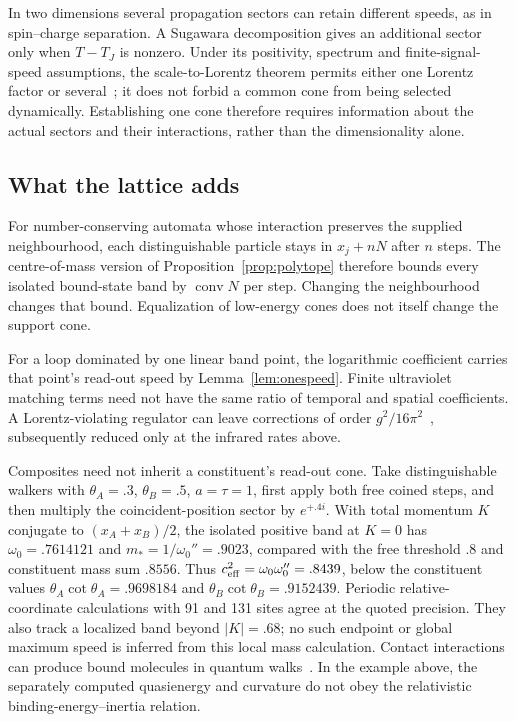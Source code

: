 \documentclass[12pt]{article}
\theoremstyle{definition}
\theoremstyle{remark}
\newcommand{\conv}{\operatorname{conv}}
\begin{document}
In two dimensions several propagation sectors can retain different speeds, as in spin--charge separation. A Sugawara decomposition gives an additional sector only when $T-T_J$ is nonzero. Under its positivity, spectrum and finite-signal-speed assumptions, the scale-to-Lorentz theorem permits either one Lorentz factor or several~\cite{Sibiryakov2014}; it does not forbid a common cone from being selected dynamically. Establishing one cone therefore requires information about the actual sectors and their interactions, rather than the dimensionality alone.

\subsection{What the lattice adds}

For number-conserving automata whose interaction preserves the supplied neighbourhood, each distinguishable particle stays in $x_j+nN$ after $n$ steps. The centre-of-mass version of Proposition~\ref{prop:polytope} therefore bounds every isolated bound-state band by $\conv N$ per step. Changing the neighbourhood changes that bound. Equalization of low-energy cones does not itself change the support cone.

For a loop dominated by one linear band point, the logarithmic coefficient carries that point's read-out speed by Lemma~\ref{lem:onespeed}. Finite ultraviolet matching terms need not have the same ratio of temporal and spatial coefficients. A Lorentz-violating regulator can leave corrections of order $g^2/16\pi^2$~\cite{Collins2004}, subsequently reduced only at the infrared rates above.

Composites need not inherit a constituent's read-out cone. Take distinguishable walkers with $\theta_A=.3$, $\theta_B=.5$, $a=\tau=1$, first apply both free coined steps, and then multiply the coincident-position sector by $e^{+.4i}$. With total momentum $K$ conjugate to $(x_A+x_B)/2$, the isolated positive band at $K=0$ has $\omega_0=.7614121$ and $m_*=1/\omega_0''=.9023$, compared with the free threshold $.8$ and constituent mass sum $.8556$. Thus $c_{\rm eff}^2=\omega_0\omega_0''=.8439$, below the constituent values $\theta_A\cot\theta_A=.9698184$ and $\theta_B\cot\theta_B=.9152439$. Periodic relative-coordinate calculations with 91 and 131 sites agree at the quoted precision. They also track a localized band beyond $|K|=.68$; no such endpoint or global maximum speed is inferred from this local mass calculation. Contact interactions can produce bound molecules in quantum walks~\cite{Ahlbrecht2012}. In the example above, the separately computed quasienergy and curvature do not obey the relativistic binding-energy--inertia relation.
\end{document}

